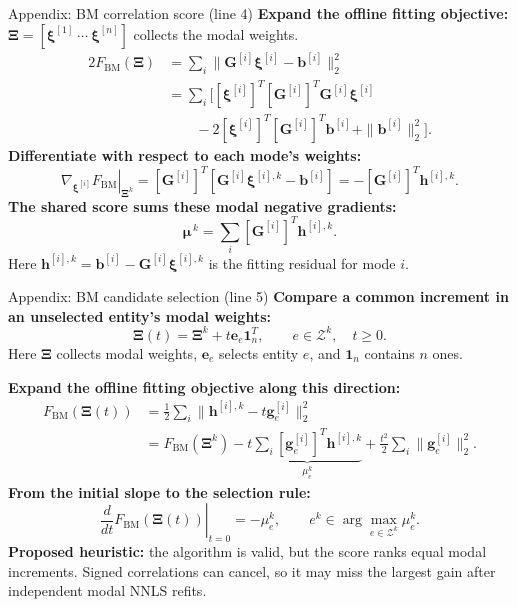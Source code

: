 \documentclass[aspectratio=169]{beamer}
\newcommand{\vect}[1]{\boldsymbol{#1}}
\newcommand{\matr}[1]{\boldsymbol{#1}}
\newcommand{\BackToBMAlgorithm}{%
  \par\vfill\hfill
  \hyperlink{ecsw-bm-algorithm}{\beamerreturnbutton{Back to BM algorithm}}%
}
\begin{document}
\begin{frame}[t]{Appendix: BM correlation score (line 4)}
\small
\setlength{\abovedisplayskip}{3pt}
\setlength{\belowdisplayskip}{3pt}
\setlength{\abovedisplayshortskip}{3pt}
\setlength{\belowdisplayshortskip}{3pt}
\hypertarget{bm-ecsw-line-4}{}%
\textbf{Expand the offline fitting objective:}
$\matr{\Xi}=[\vect{\xi}^{[1]}\ \cdots\ \vect{\xi}^{[n]}]$ collects the modal weights.
\[
  \begin{aligned}
    2F_{\mathrm{BM}}(\matr{\Xi})
    &=\sum_i\|\matr{G}^{[i]}\vect{\xi}^{[i]}-\vect{b}^{[i]}\|_2^2\\
    &=\sum_i\Big[[\vect{\xi}^{[i]}]^T[\matr{G}^{[i]}]^T
         \matr{G}^{[i]}\vect{\xi}^{[i]}\\
    &\qquad -2[\vect{\xi}^{[i]}]^T[\matr{G}^{[i]}]^T\vect{b}^{[i]}
         +\|\vect{b}^{[i]}\|_2^2\Big].
  \end{aligned}
\]
\textbf{Differentiate with respect to each mode's weights:}
\[
  \left.\nabla_{\vect{\xi}^{[i]}}F_{\mathrm{BM}}\right|_{\matr{\Xi}^k}
  =[\matr{G}^{[i]}]^T
    [\matr{G}^{[i]}\vect{\xi}^{[i],k}-\vect{b}^{[i]}]
  =-[\matr{G}^{[i]}]^T\vect{h}^{[i],k}.
\]
\textbf{The shared score sums these modal negative gradients:}
\[
  \vect{\mu}^{\,k}=\sum_i[\matr{G}^{[i]}]^T\vect{h}^{[i],k}.
\]
{\footnotesize Here $\vect{h}^{[i],k}=\vect{b}^{[i]}-\matr{G}^{[i]}\vect{\xi}^{[i],k}$
is the fitting residual for mode $i$.}
\par\vfill
\hyperlink{bm-ecsw-line-5}{}
\hfill
\hyperlink{ecsw-bm-algorithm}{}
\end{frame}

\begin{frame}[t]{Appendix: BM candidate selection (line 5)}
\small
\setlength{\abovedisplayskip}{1pt}
\setlength{\belowdisplayskip}{1pt}
\setlength{\abovedisplayshortskip}{1pt}
\setlength{\belowdisplayshortskip}{1pt}
\hypertarget{bm-ecsw-line-5}{}%
\textbf{Compare a common increment in an unselected entity's modal weights:}
\[
  \matr{\Xi}(t)=\matr{\Xi}^k+t\vect{e}_e\vect{1}_n^T,
  \qquad e\in\mathcal Z^k,\quad t\geq0.
\]
Here $\matr{\Xi}$ collects modal weights, $\vect{e}_e$ selects entity $e$,
and $\vect{1}_n$ contains $n$ ones.

\textbf{Expand the offline fitting objective along this direction:}
\[
  \begin{aligned}
    F_{\mathrm{BM}}(\matr{\Xi}(t))
    &=\frac12\sum\nolimits_i\|\vect{h}^{[i],k}-t\vect{g}_e^{[i]}\|_2^2\\
    &=F_{\mathrm{BM}}(\matr{\Xi}^k)
      -t\underbrace{\sum\nolimits_i[\vect{g}_e^{[i]}]^T\vect{h}^{[i],k}}_{\mu_e^k}
      +\frac{t^2}{2}\sum\nolimits_i\|\vect{g}_e^{[i]}\|_2^2.
  \end{aligned}
\]
\textbf{From the initial slope to the selection rule:}
\[
  \left.\frac{d}{dt}F_{\mathrm{BM}}(\matr{\Xi}(t))\right|_{t=0}
  =-\mu_e^k,
  \qquad e^k\in\arg\max_{e\in\mathcal Z^k}\mu_e^k.
\]
{\footnotesize\textbf{Proposed heuristic:} the algorithm is valid, but the score ranks equal modal increments.
Signed correlations can cancel, so it may miss the largest gain after independent modal NNLS refits.}
\BackToBMAlgorithm
\end{frame}
\end{document}
